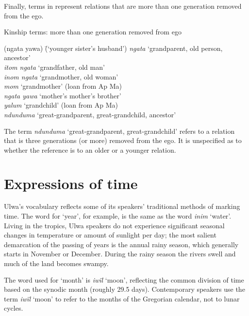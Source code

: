 Finally, terms in  represent relations that are more than one generation removed from the ego.

\ea%
    \label{ex:sem:26c}
          Kinship terms: more than one generation removed from ego
\begin{tabbing}
{(ngata yawa)} \= {(‘younger sister’s husband’)}\kill
    \textit{ngata} \> ‘grandparent, old person, ancestor’\\
    \textit{itom ngata} \> ‘grandfather, old man’\\
    \textit{inom ngata} \> ‘grandmother, old woman’\\
     \textit{mom} \> ‘grandmother’ (loan from Ap Ma)\\
    \textit{ngata yawa} \> ‘mother’s mother’s brother’\\
        \textit{yalum} \> ‘grandchild’ (loan from Ap Ma)\\
    \textit{ndunduma} \> ‘great-grandparent, great-grandchild, ancestor’
   \end{tabbing}
\z

The term \textit{ndunduma} ‘great-grandparent, great-grandchild’ refers to a relation that is three generations (or more) removed from the ego. It is unspecified as to whether the reference is to an older or a younger relation.


\section{Expressions of time}\label{sec:14.8}


Ulwa’s vocabulary reflects some of its speakers’ traditional methods of marking time. The word for ‘year’, for example, is the same as the word \textit{inim} ‘water’. Living in the tropics, Ulwa speakers do not experience significant seasonal changes in temperature or amount of sunlight per day; the most salient demarcation of the passing of years is the annual rainy season, which generally starts in November or December. During the rainy season the rivers swell and much of the land becomes swampy.

  The word used for ‘month’ is \textit{iwïl} ‘moon’, reflecting the common division of time based on the synodic month (roughly 29.5 days). Contemporary speakers use the term \textit{iwïl} ‘moon’ to refer to the months of the Gregorian calendar, not to lunar cycles.

